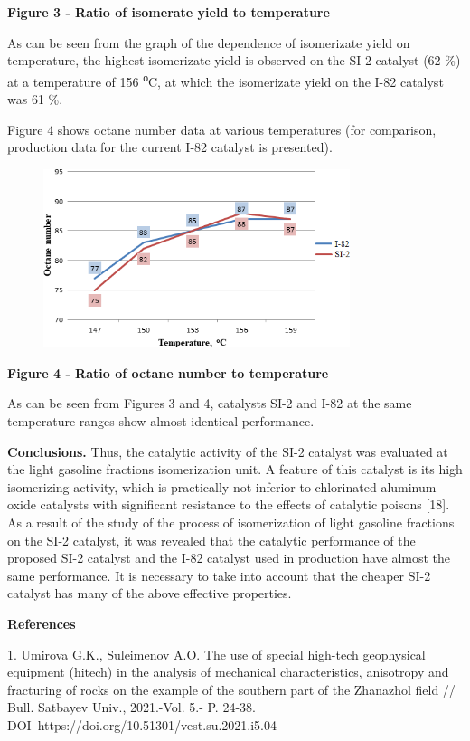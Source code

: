 \textbf{Figure 3 - Ratio of isomerate yield to temperature}

As can be seen from the graph of the dependence of isomerizate yield on
temperature, the highest isomerizate yield is observed on the SI-2
catalyst (62 \%) at a temperature of 156 \textsuperscript{о}C, at which
the isomerizate yield on the I-82 catalyst was 61 \%.

Figure 4 shows octane number data at various temperatures (for
comparison, production data for the current I-82 catalyst is presented).

\begin{figure}[H]
	\centering
	\includegraphics[width=0.8\textwidth]{assets/1057}
	\caption*{}
\end{figure}

\textbf{Figure 4 - Ratio of octane number to temperature}

As can be seen from Figures 3 and 4, catalysts SI-2 and I-82 at the same
temperature ranges show almost identical performance.

\textbf{Conclusions.} Thus, the catalytic activity of the SI-2 catalyst
was evaluated at the light gasoline fractions isomerization unit. A
feature of this catalyst is its high isomerizing activity, which is
practically not inferior to chlorinated aluminum oxide catalysts with
significant resistance to the effects of catalytic poisons {[}18{]}. As
a result of the study of the process of isomerization of light gasoline
fractions on the SI-2 catalyst, it was revealed that the catalytic
performance of the proposed SI-2 catalyst and the I-82 catalyst used in
production have almost the same performance. It is necessary to take
into account that the cheaper SI-2 catalyst has many of the above
effective properties.

\textbf{References}

1. Umirova G.K., Suleimenov A.O. The use of special high-tech
geophysical equipment (hitech) in the analysis of mechanical
characteristics, anisotropy and fracturing of rocks on the example of
the southern part of the Zhanazhol field // Bull. Satbayev Univ.,
2021.-Vol. 5.- P. 24-38. DOI~https://doi.org/10.51301/vest.su.2021.i5.04

